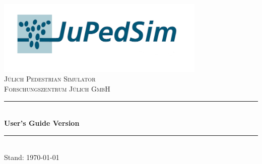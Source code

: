 
\newcommand{\HRule}{\rule{\linewidth}{0.5mm}}
\begin{titlepage}
\begin{center}

\includegraphics[width=0.75\textwidth]{../images/jupedsim_small.png} \\ [1cm]

\textsc{\LARGE Jülich Pedestrian Simulator} \\ [1.5cm]

\textsc{\small Forschungszentrum Jülich GmbH} \\ [0.5cm]

\HRule \\ [0.4cm]
{ \huge \bfseries User's Guide Version \Version} \\ [0.4cm]


\HRule \\ [1.5cm]

{\large Stand: \today}
\end{center}
\vfill
\vfill
\begin{minipage}{0.8\textwidth}
    \begin{flushleft} \large
    \end{flushleft}
\end{minipage}
\end{titlepage}
    